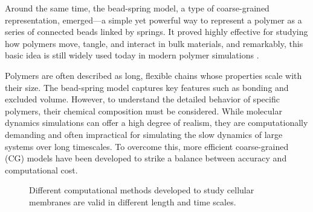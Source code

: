 \documentclass[12pt]{article}
\begin{document}
\begin{flushleft}
Around the same time, the bead-spring model, a type of coarse-grained representation, emerged—a simple yet powerful way to represent a polymer as a series of connected beads linked by springs. It proved highly effective for studying how polymers move, tangle, and interact in bulk materials, and remarkably, this basic idea is still widely used today in modern polymer simulations \cite{Kremer1990}.

Polymers are often described as long, flexible chains whose properties scale with their size. The bead-spring model captures key features such as bonding and excluded volume. However, to understand the detailed behavior of specific polymers, their chemical composition must be considered. While molecular dynamics simulations can offer a high degree of realism, they are computationally demanding and often impractical for simulating the slow dynamics of large systems over long timescales. To overcome this, more efficient coarse-grained (CG) models have been developed to strike a balance between accuracy and computational cost.

\begin{figure}[!ht]
  \centering
  \caption{Different computational methods developed to study cellular membranes are valid in different length and time scales.\cite{chabanon2017systems}}
\end{figure}


\vspace{-1em} 




\end{flushleft}
\end{document}
